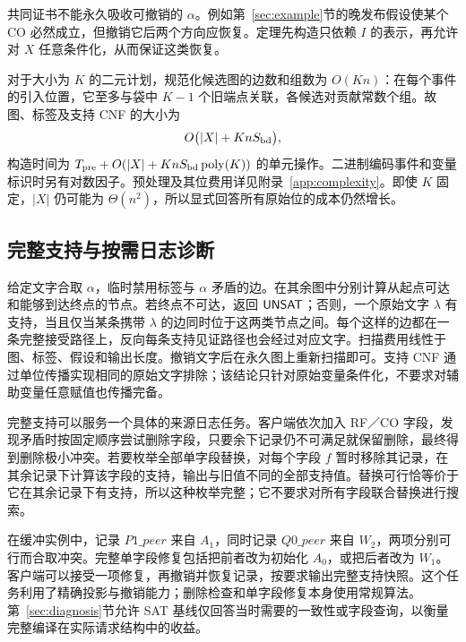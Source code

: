 共同证书不能永久吸收可撤销的 $\alpha$。例如第~\ref{sec:example}节的晚发布假设使某个 CO 必然成立，但撤销它后两个方向应恢复。定理先构造只依赖 $I$ 的表示，再允许对 $X$ 任意条件化，从而保证这类恢复。

对于大小为 $K$ 的二元计划，规范化候选图的边数和组数为 $O(Kn)$：在每个事件的引入位置，它至多与袋中 $K-1$ 个旧端点关联，各候选对贡献常数个组。故图、标签及支持 CNF 的大小为
\begin{equation}\label{eq:size}
 O\bigl(|X|+Kn S_{\rm bd}\bigr),
\end{equation}
构造时间为 $T_{\rm pre}+O(|X|+KnS_{\rm bd}\operatorname{poly}(K))$ 的单元操作。二进制编码事件和变量标识时另有对数因子。预处理及其位费用详见附录~\ref{app:complexity}。即使 $K$ 固定，$|X|$ 仍可能为 $\Theta(n^2)$，所以显式回答所有原始位的成本仍然增长。

\subsection{完整支持与按需日志诊断}\label{sec:queries}
给定文字合取 $\alpha$，临时禁用标签与 $\alpha$ 矛盾的边。在其余图中分别计算从起点可达和能够到达终点的节点。若终点不可达，返回 $\mathsf{UNSAT}$；否则，一个原始文字 $\lambda$ 有支持，当且仅当某条携带 $\lambda$ 的边同时位于这两类节点之间。每个这样的边都在一条完整接受路径上，反向每条支持见证路径也会经过对应文字。扫描费用线性于图、标签、假设和输出长度。撤销文字后在永久图上重新扫描即可。支持 CNF 通过单位传播实现相同的原始文字排除；该结论只针对原始变量条件化，不要求对辅助变量任意赋值也传播完备。

完整支持可以服务一个具体的来源日志任务。客户端依次加入 RF／CO 字段，发现矛盾时按固定顺序尝试删除字段，只要余下记录仍不可满足就保留删除，最终得到删除极小冲突。若要枚举全部单字段替换，对每个字段 $f$ 暂时移除其记录，在其余记录下计算该字段的支持，输出与旧值不同的全部支持值。替换可行恰等价于它在其余记录下有支持，所以这种枚举完整；它不要求对所有字段联合替换进行搜索。

在缓冲实例中，记录 $P1\_peer$ 来自 $A_1$，同时记录 $Q0\_peer$ 来自 $W_2$，两项分别可行而合取冲突。完整单字段修复包括把前者改为初始化 $A_0$，或把后者改为 $W_1$。客户端可以接受一项修复，再撤销并恢复记录，按要求输出完整支持快照。这个任务利用了精确投影与撤销能力；删除检查和单字段修复本身使用常规算法。第~\ref{sec:diagnosis}节允许 SAT 基线仅回答当时需要的一致性或字段查询，以衡量完整编译在实际请求结构中的收益。
